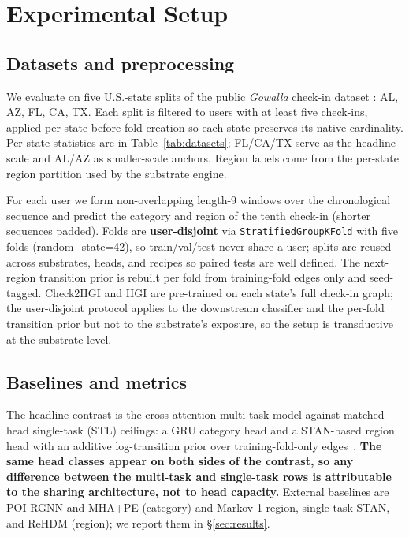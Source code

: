 \section{Experimental Setup}
\label{sec:setup}

\subsection{Datasets and preprocessing}
\label{subsec:setup-data}

We evaluate on five U.S.-state splits of the public \emph{Gowalla} check-in dataset \cite{cho2011gowalla}: AL, AZ, FL, CA, TX. Each split is filtered to users with at least five check-ins, applied per state before fold creation so each state preserves its native cardinality. Per-state statistics are in Table~\ref{tab:datasets}; FL/CA/TX serve as the headline scale and AL/AZ as smaller-scale anchors. Region labels come from the per-state region partition used by the substrate engine.



For each user we form non-overlapping length-9 windows over the chronological sequence and predict the category and region of the tenth check-in (shorter sequences padded). Folds are \textbf{user-disjoint} via \texttt{StratifiedGroupKFold} with five folds (random\_state=42), so train/val/test never share a user; splits are reused across substrates, heads, and recipes so paired tests are well defined. The next-region transition prior is rebuilt per fold from training-fold edges only and seed-tagged. Check2HGI and HGI are pre-trained on each state's full check-in graph; the user-disjoint protocol applies to the downstream classifier and the per-fold transition prior but not to the substrate's exposure, so the setup is transductive at the substrate level.

\subsection{Baselines and metrics}
\label{subsec:setup-baselines}

The headline contrast is the cross-attention multi-task model against matched-head single-task (STL) ceilings: a GRU category head and a STAN-based region head with an additive log-transition prior over training-fold-only edges~\cite{luo2021stan}. \textbf{The same head classes appear on both sides of the contrast, so any difference between the multi-task and single-task rows is attributable to the sharing architecture, not to head capacity.} External baselines are POI-RGNN and MHA+PE (category) and Markov-1-region, single-task STAN, and ReHDM (region); we report them in \S\ref{sec:results}.


